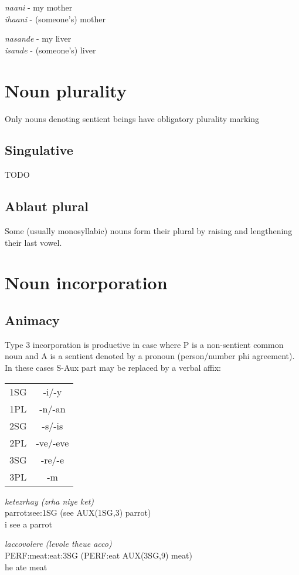 \documentclass[8pt]{book}
\begin{document}
\begin{exe}
\ex \textit{naani} - my mother \\
 \textit{ihaani} - (someone's) mother

\ex \textit{nasande} - my liver \\
 \textit{isande} - (someone's) liver

\end{exe}


\section{Noun plurality}
Only nouns denoting sentient beings have obligatory plurality marking

\subsection{Singulative}
TODO

\subsection{Ablaut plural}
Some (usually monosyllabic) nouns form their plural by raising and lengthening their last vowel.



\section{Noun incorporation}

\subsection{Animacy}
Type 3 incorporation is productive in case where P is a non-sentient common noun and A is a sentient denoted by a pronoun (person/number phi agreement). In these cases S-Aux part may be replaced by a verbal affix:

\begin{tabular}{c | c}
  1SG & -i/-y \\
  1PL & -n/-an \\
  2SG & -s/-is \\
  2PL & -ve/-eve \\
  3SG & -re/-e \\
  3PL & -m \\
\end{tabular}

\begin{exe}
\ex 
\gll \textit{ketezrhay (zrha niye ket)} \\
  parrot:see:1SG (see AUX(1SG,3) parrot) \\
\trans i see a parrot

\ex 
\gll \textit{laccovolere (levole theue acco)} \\
  PERF:meat:eat:3SG (PERF:eat AUX(3SG,9) meat) \\
\trans he ate meat
\end{exe}
\end{document}
